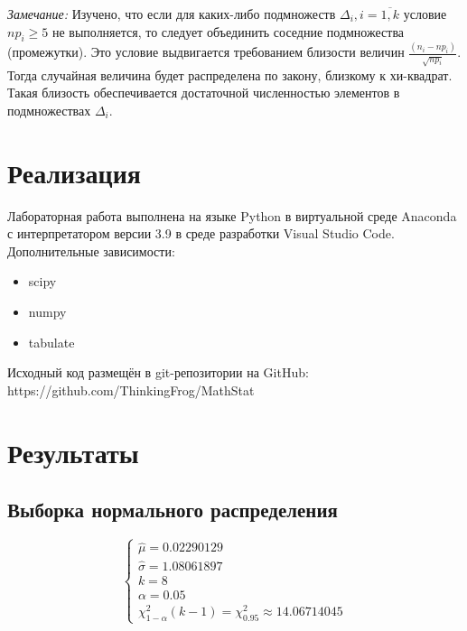 \documentclass[12pt,a4paper]{article}
\begin{document}
\textit{Замечание:} Изучено, что если для каких-либо подмножеств $\Delta_i,i=\overline{1,k}$ условие $np_i\geq5$ не выполняется, то следует объединить соседние подмножества (промежутки). Это условие выдвигается требованием близости величин $\frac{(n_i-np_i)}{\sqrt{np_i}}$. Тогда случайная величина будет распределена по закону, близкому к хи-квадрат. Такая близость обеспечивается достаточной численностью элементов в подмножествах $\Delta_i$.


\section{Реализация}
Лабораторная работа выполнена на языке Python в виртуальной среде Anaconda с интерпретатором версии 3.9 в среде разработки Visual Studio Code. Дополнительные зависимости:
\begin{itemize}
    \item scipy
    \item numpy
    \item tabulate
\end{itemize}

Исходный код размещён в git-репозитории на GitHub: \\ https://github.com/ThinkingFrog/MathStat

\section {Результаты}
\subsection{Выборка нормального распределения}
\begin{equation}
    \left\{
    \begin{array}{ll}
        \hat{\mu} = 0.02290129\\
        \hat{\sigma} = 1.08061897\\
        k = 8\\
        \alpha = 0.05\\
        \chi^2_{1 - \alpha}(k - 1)=\chi^2_{0.95} \approx 14.06714045
    \end{array}
    \right.
\end{equation}
\end{document}
